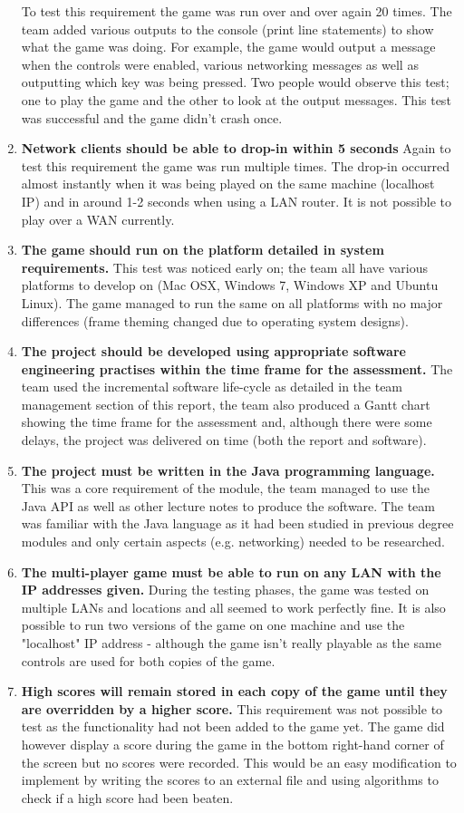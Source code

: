 \begin{enumerate}
To test this requirement the game was run over and over again 20 times. The team added various outputs to the console (print line statements) to show what the game was doing. For example, the game would output a message when the controls were enabled, various networking messages as well as outputting which key was being pressed. Two people would observe this test; one to play the game and the other to look at the output messages. This test was successful and the game didn't crash once.
\item \textbf{Network clients should be able to drop-in within 5 seconds}
Again to test this requirement the game was run multiple times. The drop-in occurred almost instantly when it was being played on the same machine (localhost IP) and in around 1-2 seconds when using a LAN router. It is not possible to play over a WAN currently.
\item \textbf{The game should run on the platform detailed in system requirements.}
This test was noticed early on; the team all have various platforms to develop on (Mac OSX, Windows 7, Windows XP and Ubuntu Linux). The game managed to run the same on all platforms with no major differences (frame theming changed due to operating system designs).
\item \textbf{The project should be developed using appropriate software engineering practises within the time frame for the assessment.} The team used the incremental software life-cycle as detailed in the team management section of this report, the team also produced a Gantt chart showing the time frame for the assessment and, although there were some delays, the project was delivered on time (both the report and software).
\item \textbf{The project must be written in the Java programming language.}
This was a core requirement of the module, the team managed to use the Java API as well as other lecture notes to produce the software. The team was familiar with the Java language as it had been studied in previous degree modules and only certain aspects (e.g. networking) needed to be researched.
\item \textbf{The multi-player game must be able to run on any LAN with the IP addresses given.}
During the testing phases, the game was tested on multiple LANs and locations and all seemed to work perfectly fine. It is also possible to run two versions of the game on one machine and use the "localhost" IP address - although the game isn't really playable as the same controls are used for both copies of the game.
\item \textbf{High scores will remain stored in each copy of the game until they are overridden by a higher score.}
This requirement was not possible to test as the functionality had not been added to the game yet. The game did however display a score during the game in the bottom right-hand corner of the screen but no scores were recorded. This would be an easy modification to implement by writing the scores to an external file and using algorithms to check if a high score had been beaten.
\end{enumerate}
